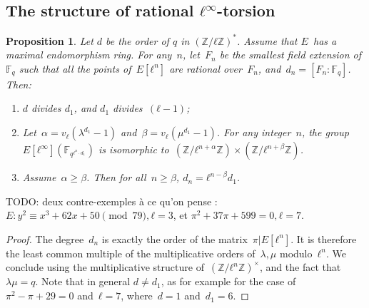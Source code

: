 \documentclass{lms}
\newcommand{\todo}[1]{{\color{red}TODO: #1}}
\newtheorem{prop}[thm]{Proposition}
\newcommand{\F}{\mathbb{F}}
\begin{document}


\subsection{The structure of rational $ℓ^∞$-torsion}

\begin{prop}\label{prop:degree-l-torsion}
Let $d$ be the order of $q$ in $(ℤ/ℓℤ)^\ast$.
Assume that $E$~has a maximal endomorphism ring.
For any~$n$, let~$F_n$ be the smallest field extension of $\F_q$
such that all the points of~$E[ℓ^n]$ are rational over~$F_n$,
and~$d_n = [F_n:\F_q]$. Then:
\begin{enumerate}
\item $d$ divides $d_1$, and $d_1$ divides~$(ℓ-1)$;
\item Let~$α = v_ℓ(λ^{d_1}-1)$ and~$β = v_{ℓ} (μ^{d_1}-1)$.
For any integer~$n$, the group $E[ℓ^∞](\F_{q^{ℓ^n · d_1}})$
is isomorphic to~$(ℤ/ℓ^{n+α} ℤ) × (ℤ/ℓ^{n + β} ℤ)$.
\item Assume~$α ≥ β$. Then for all~$n ≥ β$, $d_n = ℓ^{n-β} d_1$.
\end{enumerate}
\end{prop}
\todo{deux contre-exemples à ce qu'on pense :
$E: y^2 ≡ x^3 + 62 x + 50 \pmod{79}, ℓ = 3$,
et $π^2 + 37 π + 599 = 0, ℓ = 7$.}
\begin{proof}
The degree~$d_n$ is exactly the order of the matrix~$π|E[ℓ^n]$.
It is therefore the least common multiple of the multiplicative orders
of~$λ, μ$ modulo~$ℓ^n$.
We conclude using the multiplicative structure of~$(ℤ/ℓ^n ℤ)^×$, and the fact
that $λμ=q$.
Note that in general $d ≠ d_1$, as for example for the case
of~$π^2 - π + 29 = 0$ and~$ℓ = 7$, where~$d = 1$ and~$d_1 = 6$.
\end{proof}
\end{document}
